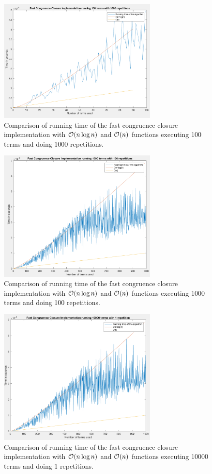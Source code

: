 \begin{figure}[h]
  \centering
  \includegraphics[width=8cm]{100_1000rep}
  \caption{Comparison of running time of the fast congruence closure implementation with
    $\mathcal{O}(n \log n)$ and $\mathcal{O}(n)$ functions executing 100 terms and doing 1000 repetitions.}
\end{figure}
\begin{figure}[h]
  \centering
  \includegraphics[width=8cm]{1000_100rep}
  \caption{Comparison of running time of the fast congruence closure implementation with
    $\mathcal{O}(n \log n)$ and $\mathcal{O}(n)$ functions executing 1000 terms and doing 100 repetitions.}
\end{figure}
\begin{figure}[h]
  \centering
  \includegraphics[width=8cm]{10000_1rep}
  \caption{Comparison of running time of the fast congruence closure implementation with
    $\mathcal{O}(n \log n)$ and $\mathcal{O}(n)$ functions executing 10000 terms and doing 1 repetitions.}
\end{figure}

